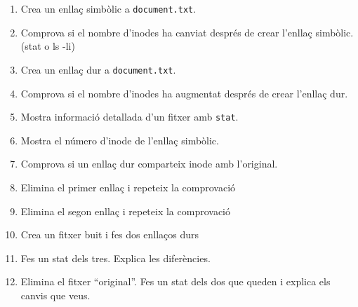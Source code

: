 \documentclass[
  12 pt,
  a4paper,
]{article}
\providecommand{\tightlist}{%
  \setlength{\itemsep}{0pt}\setlength{\parskip}{0pt}}
\begin{document}
\begin{enumerate}
\def\labelenumi{\arabic{enumi}.}
\setcounter{enumi}{25}
\tightlist
\item
  Crea un enllaç simbòlic a \texttt{document.txt}.\\
\item
  Comprova si el nombre d'inodes ha canviat després de crear l'enllaç
  simbòlic. (stat o ls -li)
\item
  Crea un enllaç dur a \texttt{document.txt}.\\
\item
  Comprova si el nombre d'inodes ha augmentat després de crear l'enllaç
  dur.
\item
  Mostra informació detallada d'un fitxer amb \texttt{stat}.
\item
  Mostra el número d'inode de l'enllaç simbòlic.\\
\item
  Comprova si un enllaç dur comparteix inode amb l'original.
\item
  Elimina el primer enllaç i repeteix la comprovació
\item
  Elimina el segon enllaç i repeteix la comprovació
\item
  Crea un fitxer buit i fes dos enllaços durs
\item
  Fes un stat dels tres. Explica les diferències.
\item
  Elimina el fitxer ``original''. Fes un stat dels dos que queden i
  explica els canvis que veus.
\end{enumerate}
\end{document}
